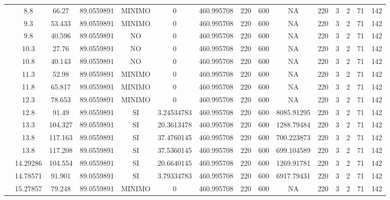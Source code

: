 \begin{table}[H]
{\begin{tabular}{|c|c|c|c|c|c|c|c|c|c|c|c|c|c|c|}
\cline{2-15}    & 8.8 & 66.27 & 89.0559891 & MINIMO & 0   & 460.995708 & 220 & 600 & NA  & 220 & 3   & 2   & 71  & 142 \bigstrut\\
\cline{2-15}    & 9.3 & 53.433 & 89.0559891 & MINIMO & 0   & 460.995708 & 220 & 600 & NA  & 220 & 3   & 2   & 71  & 142 \bigstrut\\
\cline{2-15}    & 9.8 & 40.596 & 89.0559891 & NO  & 0   & 460.995708 & 220 & 600 & NA  & 220 & 3   & 2   & 71  & 142 \bigstrut\\
\cline{2-15}    & 10.3 & 27.76 & 89.0559891 & NO  & 0   & 460.995708 & 220 & 600 & NA  & 220 & 3   & 2   & 71  & 142 \bigstrut\\
\cline{2-15}    & 10.8 & 40.143 & 89.0559891 & NO  & 0   & 460.995708 & 220 & 600 & NA  & 220 & 3   & 2   & 71  & 142 \bigstrut\\
\cline{2-15}    & 11.3 & 52.98 & 89.0559891 & MINIMO & 0   & 460.995708 & 220 & 600 & NA  & 220 & 3   & 2   & 71  & 142 \bigstrut\\
\cline{2-15}    & 11.8 & 65.817 & 89.0559891 & MINIMO & 0   & 460.995708 & 220 & 600 & NA  & 220 & 3   & 2   & 71  & 142 \bigstrut\\
\cline{2-15}    & 12.3 & 78.653 & 89.0559891 & MINIMO & 0   & 460.995708 & 220 & 600 & NA  & 220 & 3   & 2   & 71  & 142 \bigstrut\\
\cline{2-15}    & 12.8 & 91.49 & 89.0559891 & SI  & 3.24534783 & 460.995708 & 220 & 600 & 8085.91295 & 220 & 3   & 2   & 71  & 142 \bigstrut\\
\cline{2-15}    & 13.3 & 104.327 & 89.0559891 & SI  & 20.3613478 & 460.995708 & 220 & 600 & 1288.79484 & 220 & 3   & 2   & 71  & 142 \bigstrut\\
\cline{2-15}    & 13.8 & 117.163 & 89.0559891 & SI  & 37.4760145 & 460.995708 & 220 & 600 & 700.223873 & 220 & 3   & 2   & 71  & 142 \bigstrut\\
\cline{2-15}    & 13.8 & 117.208 & 89.0559891 & SI  & 37.5360145 & 460.995708 & 220 & 600 & 699.104589 & 220 & 3   & 2   & 71  & 142 \bigstrut\\
\cline{2-15}    & 14.29286 & 104.554 & 89.0559891 & SI  & 20.6640145 & 460.995708 & 220 & 600 & 1269.91781 & 220 & 3   & 2   & 71  & 142 \bigstrut\\
\cline{2-15}    & 14.78571 & 91.901 & 89.0559891 & SI  & 3.79334783 & 460.995708 & 220 & 600 & 6917.79431 & 220 & 3   & 2   & 71  & 142 \bigstrut\\
\cline{2-15}    & 15.27857 & 79.248 & 89.0559891 & MINIMO & 0   & 460.995708 & 220 & 600 & NA  & 220 & 3   & 2   & 71  & 142 \bigstrut\\

\end{tabular}}
\end{table}
